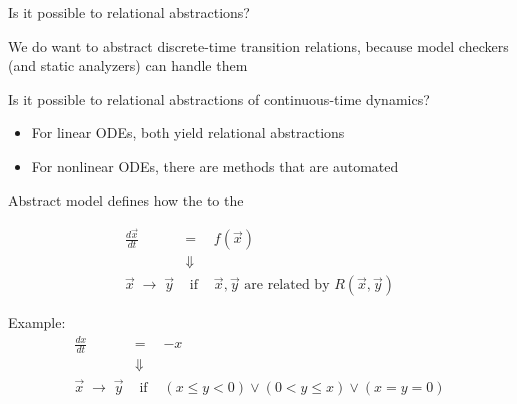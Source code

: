 \documentclass{seminar}
\begin{document}
\begin{slide}

Is it possible to {} relational abstractions?

\bigskip

We do {} want to abstract discrete-time transition relations,
because model checkers (and static analyzers) can handle them

\bigskip
Is it possible to {} relational abstractions of
continuous-time dynamics?

\begin{itemize}
\item
For linear ODEs, both {}
yield {} relational abstractions

\item
For nonlinear ODEs, there are {} methods that are
{} automated
\end{itemize}

\end{slide}
\begin{slide}

Abstract model defines how the {}
{} to the {}

\begin{eqnarray}
 \frac{d\vec{x}}{dt} & = & f(\vec{x})
\\ & \Downarrow &
\\ 
 \vec{x}\;\rightarrow\;\vec{y} & \mbox{ if } &
 \vec{x},\vec{y} \mbox{ are related by } R(\vec{x},\vec{y})
\end{eqnarray}

\bigskip
Example:
\begin{eqnarray}
 \frac{dx}{dt} & = & -x
\\ & \Downarrow &
\\ 
 \vec{x}\;\rightarrow\;\vec{y} & \mbox{ if } &
(x \leq y < 0) \vee (0 < y \leq x) \vee (x = y = 0)
\end{eqnarray}

\end{slide}
\end{document}
